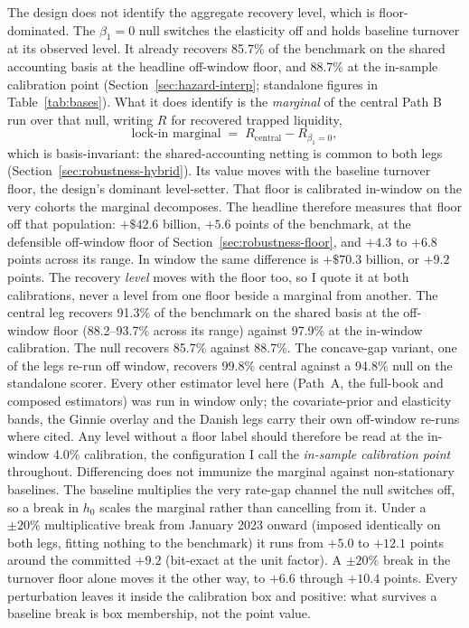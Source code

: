\documentclass[12pt]{article}
\begin{document}
The design does not identify the aggregate recovery level, which is floor-dominated. The $\beta_1 = 0$ null switches the elasticity off and holds baseline turnover at its observed level. It already recovers 85.7\% of the benchmark on the shared accounting basis at the headline off-window floor, and 88.7\% at the in-sample calibration point (Section~\ref{sec:hazard-interp}; standalone figures in Table~\ref{tab:bases}). What it does identify is the \emph{marginal} of the central Path B run over that null, writing $R$ for recovered trapped liquidity,
\begin{equation}\label{eq:marginal}
\text{lock-in marginal} \;=\; R_{\text{central}} - R_{\beta_1 = 0},
\end{equation}
which is basis-invariant: the shared-accounting netting is common to both legs (Section~\ref{sec:robustness-hybrid}). Its value moves with the baseline turnover floor, the design's dominant level-setter. That floor is calibrated in-window on the very cohorts the marginal decomposes. The headline therefore measures that floor off that population: $+\$42.6$ billion, $+5.6$ points of the benchmark, at the defensible off-window floor of Section~\ref{sec:robustness-floor}, and $+4.3$ to $+6.8$ points across its range. In window the same difference is $+\$70.3$ billion, or $+9.2$ points. The recovery \emph{level} moves with the floor too, so I quote it at both calibrations, never a level from one floor beside a marginal from another. The central leg recovers 91.3\% of the benchmark on the shared basis at the off-window floor (88.2--93.7\% across its range) against 97.9\% at the in-window calibration. The null recovers 85.7\% against 88.7\%. The concave-gap variant, one of the legs re-run off window, recovers 99.8\% central against a 94.8\% null on the standalone scorer. Every other estimator level here (Path~A, the full-book and composed estimators) was run in window only; the covariate-prior and elasticity bands, the Ginnie overlay and the Danish legs carry their own off-window re-runs where cited. Any level without a floor label should therefore be read at the in-window 4.0\% calibration, the configuration I call the \emph{in-sample calibration point} throughout. Differencing does not immunize the marginal against non-stationary baselines. The baseline multiplies the very rate-gap channel the null switches off, so a break in $h_0$ scales the marginal rather than cancelling from it. Under a $\pm 20\%$ multiplicative break from January 2023 onward (imposed identically on both legs, fitting nothing to the benchmark) it runs from $+5.0$ to $+12.1$ points around the committed $+9.2$ (bit-exact at the unit factor). A $\pm 20\%$ break in the turnover floor alone moves it the other way, to $+6.6$ through $+10.4$ points. Every perturbation leaves it inside the calibration box and positive: what survives a baseline break is box membership, not the point value.
\end{document}
